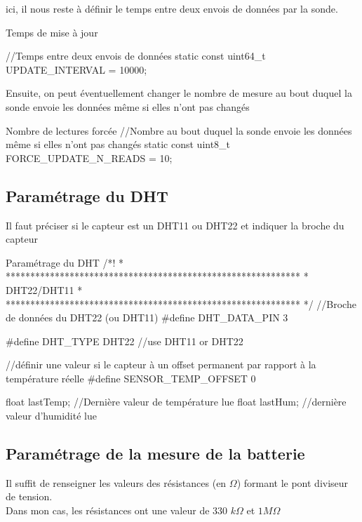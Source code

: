 ici, il nous reste à définir le temps entre deux envois de données par la sonde.

\begin{Cpp}{Temps de mise à jour}

//Temps entre deux envois de données
static const uint64_t UPDATE_INTERVAL = 10000;   
\end{Cpp}

Ensuite, on peut éventuellement changer le nombre de mesure au bout duquel la sonde envoie les données même si elles n'ont pas changés

\begin{Cpp}{Nombre de lectures forcée}
    //Nombre au bout duquel la sonde envoie les données même si elles n'ont pas changés
    static const uint8_t FORCE_UPDATE_N_READS = 10;
\end{Cpp}



\subsection{Paramétrage du DHT}

Il faut préciser si le capteur est un DHT11 ou DHT22 et indiquer la broche du capteur

\begin{Cpp}{Paramétrage du DHT}
    /*!
    * ************************************************************
    * DHT22/DHT11
    * ************************************************************
    */
   //Broche de données du DHT22 (ou DHT11)
   #define DHT_DATA_PIN 3
   
   #define DHT_TYPE DHT22 //use DHT11 or DHT22
   
   //définir une valeur si le capteur à un offset permanent par rapport à la température réelle
   #define SENSOR_TEMP_OFFSET 0
   
   float lastTemp;   //Dernière valeur de température lue
   float lastHum;    //dernière valeur d'humidité lue
   
\end{Cpp}


\subsection{Paramétrage de la mesure de la batterie}

Il suffit de renseigner les valeurs des résistances (en $\Omega$) formant le pont diviseur de tension.\\
Dans mon cas, les résistances ont une valeur de 330 $k\Omega$ et $1 M\Omega$


